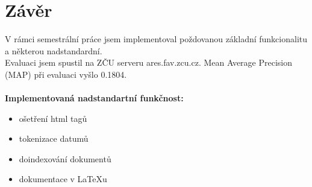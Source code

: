 \chapter{Závěr}
V rámci semestrální práce jsem implementoval poždovanou základní funkcionalitu a některou nadstandardní.\\
Evaluaci jsem spustil na ZČU serveru ares.fav.zcu.cz. Mean Average Precision (MAP) při evaluaci vyšlo 0.1804.
\\
\\
\setlength{\parskip}{0em}
\textbf{Implementovaná nadstandartní funkčnost:}
\begin{itemize}
\item ošetření html tagů
\item tokenizace datumů
\item doindexování dokumentů
\item dokumentace v LaTeXu
\end{itemize}
